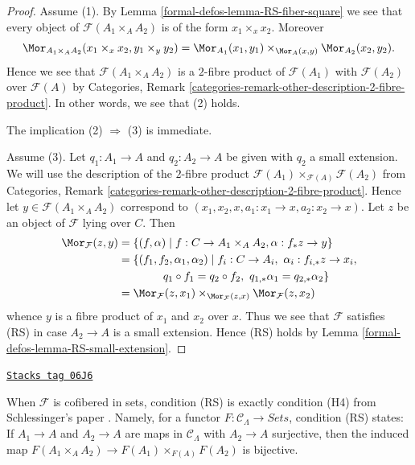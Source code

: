 \begin{proof}
Assume (1). By
Lemma \ref{formal-defos-lemma-RS-fiber-square}
we see that every object of $\mathcal{F}(A_1 \times_A A_2)$
is of the form $x_1 \times_x x_2$. Moreover
$$
\Mor_{A_1 \times_A A_2}(x_1 \times_x x_2, y_1 \times_y y_2) =
\Mor_{A_1}(x_1, y_1) \times_{\Mor_A(x, y)}
\Mor_{A_2}(x_2, y_2).
$$
Hence we see that $\mathcal{F}(A_1 \times_A A_2)$ is a $2$-fibre product
of $\mathcal{F}(A_1)$ with $\mathcal{F}(A_2)$ over $\mathcal{F}(A)$ by
Categories, Remark \ref{categories-remark-other-description-2-fibre-product}.
In other words, we see that (2) holds.

\medskip\noindent
The implication (2) $\Rightarrow$ (3) is immediate.

\medskip\noindent
Assume (3). Let $q_1 : A_1 \to A$ and $q_2 : A_2 \to A$ be given with
$q_2$ a small extension. We will use the description of the $2$-fibre product
$\mathcal{F}(A_1) \times_{\mathcal{F}(A)} \mathcal{F}(A_2)$ from
Categories, Remark \ref{categories-remark-other-description-2-fibre-product}.
Hence let $y \in \mathcal{F}(A_1 \times_A A_2)$ correspond to
$(x_1, x_2, x, a_1 : x_1 \to x, a_2 : x_2 \to x)$.
Let $z$ be an object of $\mathcal{F}$ lying over $C$. Then
\begin{align*}
\Mor_\mathcal{F}(z, y) & =
\{(f, \alpha) \mid f : C \to A_1 \times_A A_2,
\alpha : f_*z \to y\} \\
& = \{(f_1, f_2, \alpha_1, \alpha_2) \mid
f_i : C \to A_i, \ \alpha_i : f_{i, *}z \to x_i, \\
& \quad\quad\quad\quad
q_1 \circ f_1 = q_2 \circ f_2, \ q_{1, *} \alpha_1 = q_{2, *}\alpha_2\} \\
& =
\Mor_\mathcal{F}(z, x_1) \times_{\Mor_\mathcal{F}(z, x)}
\Mor_\mathcal{F}(z, x_2)
\end{align*}
whence $y$ is a fibre product of $x_1$ and $x_2$ over $x$. Thus we see
that $\mathcal{F}$ satisfies (RS) in case $A_2 \to A$ is a small extension.
Hence (RS) holds by
Lemma \ref{formal-defos-lemma-RS-small-extension}.
\end{proof}

\begin{remark}
\label{formal-defos-remark-compare-schlessinger-H4}
\href{https://stacks.math.columbia.edu/tag/06J6}{\texttt{Stacks tag 06J6}}

When $\mathcal{F}$ is cofibered in sets, condition (RS) is exactly condition
(H4) from Schlessinger's paper \cite[Theorem 2.11]{Sch}.  Namely, for
a functor $F: \mathcal{C}_\Lambda \to \textit{Sets}$, condition
(RS) states: If $A_1 \to A$ and $A_2 \to A$ are maps in
$\mathcal{C}_\Lambda$ with $A_2 \to A$ surjective, then the induced
map $F(A_1 \times_A A_2) \to F(A_1) \times_{F(A)} F(A_2)$ is
bijective.
\end{remark}

